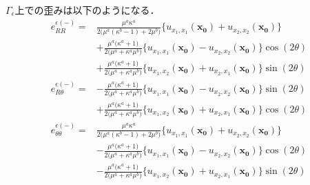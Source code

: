 $\Gamma_\epsilon$上での歪みは以下のようになる．
\begin{align}
	e_{RR}^{\epsilon(-)}
	=&\frac{\mu^{a}\kappa^{a}}{2\bigl(\mu^{a}(\kappa^{b}-1)+2\mu^{b}\bigr)}
	\bigl\{u_{x_{1},x_{1}}(\bm{x_{0}})+u_{x_{2},x_{2}}(\bm{x_{0}})\bigr\}
	\nonumber
	\\
	&+\frac{\mu^{a}\bigl(\kappa^{a}+1\bigr)}{2\bigl(\mu^{a}+\kappa^{a}\mu^{b}\bigr)}
	\bigl\{u_{x_{1},x_{1}}(\bm{x_{0}})-u_{x_{2},x_{2}}(\bm{x_{0}})\bigr\}\cos(2\theta)
	\nonumber
	\\
	&+\frac{\mu^{a}\bigl(\kappa^{a}+1\bigr)}{2\bigl(\mu^{a}+\kappa^{a}\mu^{b}\bigr)}
	\bigl\{u_{x_{1},x_{2}}(\bm{x_{0}})+u_{x_{2},x_{1}}(\bm{x_{0}})\bigr\}\sin(2\theta)
	\label{eq:eRRInEpsSol}
\end{align}
\begin{align}
	e_{R\theta}^{\epsilon(-)}
	=&-\frac{\mu^{a}\bigl(\kappa^{a}+1\bigr)}{2\bigl(\mu^{a}+\kappa^{a}\mu^{b}\bigr)}
	\bigl\{u_{x_{1},x_{1}}(\bm{x_{0}})-u_{x_{2},x_{2}}(\bm{x_{0}})\bigr\}\sin(2\theta)
	\nonumber
	\\
	&+\frac{\mu^{a}\bigl(\kappa^{a}+1\bigr)}{2\bigl(\mu^{a}+\kappa^{a}\mu^{b}\bigr)}
	\bigl\{u_{x_{1},x_{2}}(\bm{x_{0}})+u_{x_{2},x_{1}}(\bm{x_{0}})\bigr\}\cos(2\theta)
	\label{eq:eRThInEpsSol}
\end{align}
\begin{align}
	e_{\theta\theta}^{\epsilon(-)}
	=&\frac{\mu^{a}\kappa^{a}}{2\bigl(\mu^{a}(\kappa^{b}-1)+2\mu^{b}\bigr)}
	\bigl\{u_{x_{1},x_{1}}(\bm{x_{0}})+u_{x_{2},x_{2}}(\bm{x_{0}})\bigr\}
	\nonumber
	\\
	&-\frac{\mu^{a}\bigl(\kappa^{a}+1\bigr)}{2\bigl(\mu^{a}+\kappa^{a}\mu^{b}\bigr)}
	\bigl\{u_{x_{1},x_{1}}(\bm{x_{0}})-u_{x_{2},x_{2}}(\bm{x_{0}})\bigr\}\cos(2\theta)
	\nonumber
	\\
	&-\frac{\mu^{a}\bigl(\kappa^{a}+1\bigr)}{2\bigl(\mu^{a}+\kappa^{a}\mu^{b}\bigr)}
	\bigl\{u_{x_{1},x_{2}}(\bm{x_{0}})+u_{x_{2},x_{1}}(\bm{x_{0}})\bigr\}\sin(2\theta)
	\label{eq:eThThInEpsSol}
\end{align}

